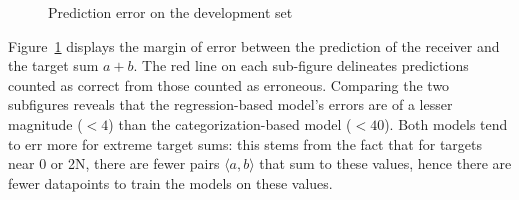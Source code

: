 \documentclass[twocolumn]{article}
\begin{document}
\begin{figure}[ht]
    \centering
    
    \caption{Prediction error on the development set}
    \label{fig:error}
\end{figure}

Figure~\ref{fig:error} displays the margin of error between the prediction of the receiver and the target sum $a+b$.
The red line on each sub-figure delineates predictions counted as correct from those counted as erroneous.
Comparing the two subfigures reveals that the regression-based model's errors are of a lesser magnitude ($<4$) than the categorization-based model ($<40$).
Both models tend to err more for extreme target sums: this stems from the fact that for targets near 0 or 2N, there are fewer pairs $\langle a,b \rangle$ that sum to these values, hence there are fewer datapoints to train the models on these values.
\end{document}
